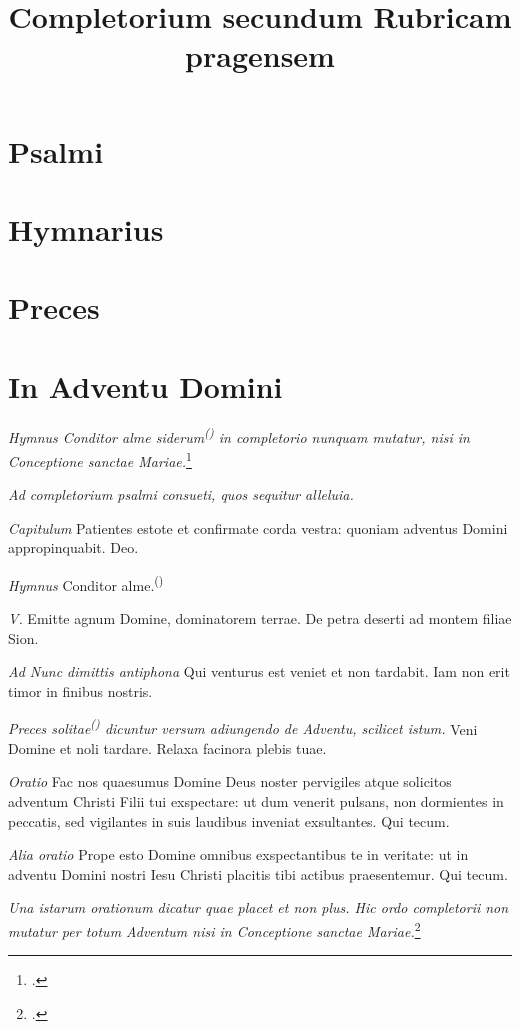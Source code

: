 \documentclass[a5paper, 12pt]{book}
\title{Completorium secundum Rubricam pragensem}
\newcommand{\rubrica}[1]{\textit{#1}}
\newcommand{\incipit}[1]{\textup{#1}}
\newcommand{\hymnus}[1]{%
  \phantomsection
  \label{hym:#1}
  }
\newcommand{\quickref}[1]{\textsuperscript{\textup{(\pageref{#1})}}}
\begin{document}
\maketitle

\chapter{Psalmi}

\chapter{Hymnarius}

\hymnus{conditor}

\chapter{Preces}
\label{preces}

\chapter{In Adventu Domini}

\rubrica{Hymnus \incipit{Conditor alme siderum}\quickref{hym:conditor}
  in completorio
  nunquam mutatur, nisi in Conceptione sanctae Mariae.}\footcite[83r]{bp1502}

\rubrica{Ad completorium psalmi consueti, quos sequitur \incipit{alleluia.}}

\rubrica{Capitulum}
Patientes estote et confirmate corda vestra:
quoniam adventus Domini appropinquabit.
Deo.

\rubrica{Hymnus}
Conditor alme.\quickref{hym:conditor}

\rubrica{V.}
Emitte agnum Domine, dominatorem terrae.
De petra deserti ad montem filiae Sion.

\rubrica{Ad Nunc dimittis antiphona}
Qui venturus est veniet et non tardabit. Iam non erit timor in finibus nostris.

\rubrica{Preces solitae\quickref{preces}
  dicuntur versum adiungendo de Adventu, scilicet istum.}
Veni Domine et noli tardare. Relaxa facinora plebis tuae.

\rubrica{Oratio}
Fac nos quaesumus Domine Deus noster pervigiles atque solicitos adventum
Christi Filii tui exspectare: ut dum venerit pulsans,
non dormientes in peccatis, sed vigilantes in suis laudibus inveniat
exsultantes. Qui tecum.

\rubrica{Alia oratio}
Prope esto Domine omnibus exspectantibus te in veritate:
ut in adventu Domini nostri Iesu Christi placitis tibi actibus praesentemur.
Qui tecum.

\rubrica{Una istarum orationum dicatur quae placet et non plus.
  Hic ordo completorii non mutatur per totum Adventum
  nisi in Conceptione sanctae Mariae.}\footcite[83r-83v]{bp1502}

\printbibliography
\end{document}
